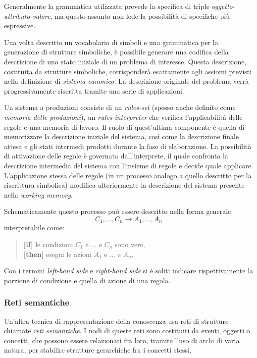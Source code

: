Generalmente la grammatica utilizzata prevede la specifica di triple \emph{oggetto-attributo-valore}, ma questo assunto non lede la possibilità di specifiche più espressive. \cite{jackson1999}

Una volta descritto un vocabolario di simboli e una grammatica per la generazione di strutture simboliche, è possibile generare una codifica della descrizione di uno stato iniziale di un problema di interesse. Questa descrizione, costituita da strutture simboliche, corrisponderà esattamente agli assiomi previsti nella definizione di \emph{sistema canonico}. La descrizione originale del problema verrà progressivamente riscritta tramite una serie di applicazioni.

Un sistema a produzioni consiste di un \emph{rules-set} (spesso anche definito come \emph{memoria delle produzioni}), un \emph{rules-interpreter} che verifica l'applicabilità delle regole e una memoria di lavoro. Il ruolo di quest'ultima componente è quella di memorizzare la descrizione iniziale del sistema, così come la descrizione finale attesa e gli stati intermedi prodotti durante la fase di elaborazione. La possibilità di attivazione delle regole è governata dall'interprete, il quale confronta la descrizione intermedia del sistema con l'insieme di regole e decide quale applicare. L'applicazione stessa delle regole (in un processo analogo a quello descritto per la riscrittura simbolica) modifica ulteriormente la descrizione del sistema presente nella \emph{working memory}.

Schematicamente questo processo può essere descritto nella forma generale
\[
C_1, \dots, C_n \rightarrow A_1, \dots, A_n
\]
interpretabile come:
\begin{quote}
	{\bfseries [if]} le condizioni $C_1$ e $\dots$ e $C_n$ sono vere,\\
	{\bfseries [then]} esegui le azioni $A_1$ e $\dots$ e $A_n$.
\end{quote}

Con i termini \emph{left-hand side} e \emph{right-hand side} si è soliti indicare rispettivamente la porzione di condizione e quella di azione di una regola.

\subsubsection{Reti semantiche}
Un'altra tecnica di rappresentazione della conoscenza usa reti di strutture chiamate \emph{reti semantiche}. I nodi di queste reti sono costituiti da eventi, oggetti o concetti, che possono essere relazionati fra loro, tramite l'uso di archi di varia natura, per stabilire strutture gerarchiche fra i concetti stessi.~\cite{development1993}

